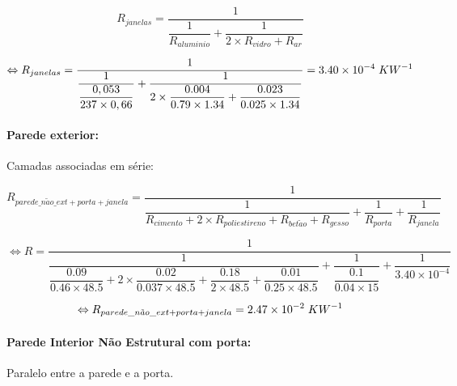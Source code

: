 \documentclass[12pt, a4paper]{article}
\begin{document}
\begin{equation}
	R_{janelas} = \dfrac{1}{\dfrac{1}{R_{aluminio}} + \dfrac{1}{2 \times R_{vidro} + R_{ar}}}
	\label{eq:zona_a_janelas}
\end{equation}

\begin{equation}
	\Leftrightarrow
	R_{janelas} =
	\dfrac{1}{
		\dfrac{1}{
			\dfrac{0,053}{237 \times 0,66}
		}+
		\dfrac{1}{
			2 \times \dfrac{0.004}{0.79 \times 1.34} +
			\dfrac{0.023}{0.025 \times 1.34}
		}
	}
		= 3.40 \times 10^{-4} \hspace{1mm} KW^{-1}
	\label{eq:zona_a_janelas2}
\end{equation}


\paragraph{Parede exterior:}\label{par:zona_a_ext}Camadas associadas em série:

\begin{equation}
    R_{parede\_n\tilde{a}o\_ext + porta + janela} =
        \dfrac{1}{
			\dfrac{1}{
			R_{cimento} + 2 \times R_{poliestireno} + R_{bet\tilde{a}o} + R_{gesso}
			}
			+
			\dfrac{1}{
				R_{porta}
			}
			+
			\dfrac{1}{
				R_{janela}
			}
		}
    \label{eq:zona_a_ext_1}
\end{equation}

\begin{equation}
    \Leftrightarrow R =
        \dfrac{1}{
			\dfrac{1}{
				\dfrac{0.09}{0.46 \times 48.5} +
				2 \times \dfrac{0.02}{0.037 \times 48.5} +
				\dfrac{0.18}{2 \times 48.5} +
				\dfrac{0.01}{0.25 \times 48.5}
        	}
			+
			\dfrac{1}{
            	\dfrac{0.1}{0.04 \times 15}
			}
			+
			\dfrac{1}{
            	3.40 \times 10^{-4}
			}
		}
    \label{eq:zona_a_ext_2}
\end{equation}

\begin{equation}
	\Leftrightarrow R_{parede\_n\tilde{a}o\_ext + porta + janela} = 2.47 \times 10^{-2} \hspace{1mm} KW^{-1}
	\label{eq:zona_a_ext_3}
\end{equation}

\paragraph{Parede Interior N\~ao Estrutural com porta:}\label{par:zona_a_int_n_est}Paralelo entre a parede e a porta.
\end{document}
